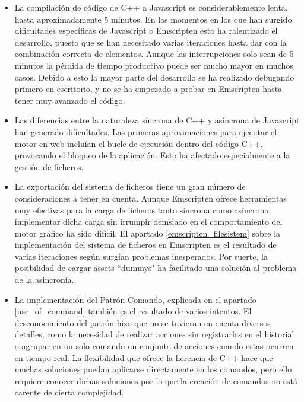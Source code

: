 \begin{itemize}
    \item La compilación de código de C++ a Javascript es considerablemente lenta, hasta aproximadamente 5 minutos. En los momentos en los que han surgido dificultades específicas de Javascript o Emscripten esto ha ralentizado el desarrollo, puesto que se han necesitado varias iteraciones hasta dar con la combinación correcta de elementos. Aunque las interrupciones solo sean de 5 minutos la pérdida de tiempo productivo puede ser mucho mayor en muchos casos. Debido a esto la mayor parte del desarrollo se ha realizado debugando primero en escritorio, y no se ha empezado a probar en Emscripten hasta tener muy avanzado el código.

    \item Las diferencias entre la naturaleza síncrona de C++ y asíncrona de Javascript han generado dificultades. Las primeras aproximaciones para ejecutar el motor en web incluían el bucle de ejecución dentro del código C++, provocando el bloqueo de la aplicación. Esto ha afectado especialmente a la gestión de ficheros.

    \item La exportación del sistema de ficheros tiene un gran número de consideraciones a tener en cuenta. Aunque Emscripten ofrece herramientas muy efectivas para la carga de ficheros tanto síncrona como asíncrona, implementar dicha carga sin irrumpir demsiado en el comportamiento del motor gráfico ha sido difícil. El apartado \ref{emscripten_filesistem} sobre la implementación del sistema de ficheros en Emscripten es el resultado de varias iteraciones según surgían problemas inesperados. Por suerte, la posibilidad de cargar assets ``dummys" ha facilitado una solución al problema de la asincronía.
    
    \item La implementación del Patrón Comando, explicada en el apartado \ref{use_of_command} también es el resultado de varios intentos. El desconocimiento del patrón hizo que no se tuvieran en cuenta diversos detalles, como la necesidad de realizar acciones sin registrarlas en el historial o agrupar en un solo comando un conjunto de acciones cuando estas ocurren en tiempo real. La flexibilidad que ofrece la herencia de C++ hace que muchas soluciones puedan aplicarse directamente en los comandos, pero ello requiere conocer dichas soluciones por lo que la creación de comandos no está carente de cierta complejidad.
    

\end{itemize}
